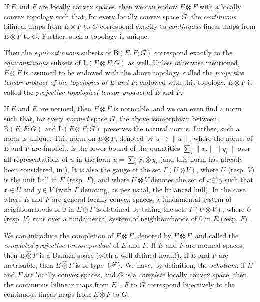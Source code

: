 \documentclass{article}
\theoremstyle{plain}
\newenvironment{theorem}[1]
    {\renewcommand\theinnercustomtheorem{#1}\innercustomtheorem}
    {\endinnercustomtheorem}
\newcommand{\BB}{\mathrm{B}}
\newcommand{\LL}{\mathrm{L}}
\newcommand{\FF}{\mbox{\normalfont($\mathscr{F}$)}}
\newcommand{\hotimes}{\widehat{\otimes}}
\newcommand{\oldpage}[1]{\marginpar{\footnotesize$\Big\vert$ \textit{p.~#1}}}
\begin{document}
\begin{theorem}{1}
\label{theorem1}
  If $E$ and $F$ are locally convex spaces, then we can endow $E\otimes F$ with a locally convex topology such that, for every locally convex space $G$, the \emph{continuous} bilinear maps from $E\times F$ to $G$ correspond exactly to \emph{continuous} linear maps from $E\otimes F$ to $G$.
  Further, such a topology is unique.
\end{theorem}

Then the \emph{equicontinuous} subsets of $\BB(E,F;G)$ correspond exactly to the \emph{equicontinuous} subsets of $\LL(E\otimes F;G)$ as well.
Unless otherwise mentioned, $E\otimes F$ is assumed to be endowed with the above topology, called the \emph{projective tensor product of the topologies of $E$ and $F$};
endowed with this topology, $E\otimes F$ is called the \emph{projective topological tensor product} of $E$ and $F$.

If $E$ and $F$ are normed, then $E\otimes F$ is normable, and we can even find a norm such that, for every \emph{normed} space $G$, the above isomorphism between $\BB(E,F;G)$ and $\LL(E\otimes F;G)$ preserves the natural norms.
Further, such a norm is unique.
This norm on $E\otimes F$, denoted by $u\mapsto\|u\|$, where the norms of $E$ and $F$ are implicit, is the lower bound of the quantities $\sum_i\|x_i\|\|y_i\|$ over all representations of $u$ in the form $u=\sum_i x_i\otimes y_i$ (and this norm has already been considered, in \cite{8}).
It is also the gauge of the set $\Gamma(U\otimes V)$, where $U$ (resp. $V$) is the unit ball in $E$ (resp. $F$), and where $U\otimes V$ denotes the set of $x\otimes y$ such that $x\in U$ and $y\in V$
\oldpage{77}
(with $\Gamma$ denoting, as per usual, the balanced hull).
In the case where $E$ and $F$ are general locally convex spaces, a fundamental system of neighbourhoods of $0$ in $E\otimes F$ is obtained by taking the sets $\Gamma(U\otimes V)$, where $U$ (resp. $V$) runs over a fundamental system of neighbourhoods of $0$ in $E$ (resp. $F$).

We can introduce the completion of $E\otimes F$, denoted by $E\hotimes F$, and called the \emph{completed projective tensor product} of $E$ and $F$.
If $E$ and $F$ are normed spaces, then $E\hotimes F$ is a Banach space (with a well-defined norm!).
If $E$ and $F$ are metrisable, then $E\hotimes F$ is of type~$\FF$.
We have, by definition, the \emph{scholium}: if $E$ and $F$ are locally convex spaces, and $G$ is a \emph{complete} locally convex space, then the continuous bilinear maps from $E\times F$ to $G$ correspond bijectively to the continuous linear maps from $E\hotimes F$ to $G$.
\end{document}
